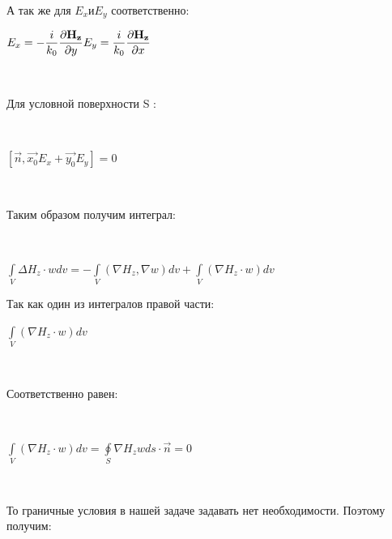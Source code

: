 \begin{flushleft}
	А так же для $ E_{x} и E_{y} $ соответственно: \\
\end{flushleft}
\begin{center}
	$ E_{x} = - 
	\dfrac{i}{k_{0}}
	\dfrac{\partial\vec{H_{z}}}{\partial y} \\
	E_{y} = \dfrac{i}{k_{0}}
	\dfrac{\partial\vec{H_{z}}}{\partial x} \\ $
\end{center} \\
\begin{flushleft}
	Для условной поверхности S :
\end{flushleft} \\
\begin{center}
	$ [\vec{n}, \vec{x_{0}}E_{x} + \vec{y_{0}}E_{y}] = 0 $
\end{center}\\

\begin{flushleft}
	Таким образом получим интеграл:
\end{flushleft} \\

\begin{center}
	$ \int\limits_{V}^{} \Delta H_{z} \cdot wdv = - \int\limits_{V}^{}(\nabla H_{z}, \nabla w)dv +  \int\limits_{V}^{}(\nabla H_{z} \cdot w)dv
	$ \\
\end{center}

\begin{flushleft}
	Так как один из интегралов правой части: 
\end{flushleft}
\begin{center}
	$  \int\limits_{V}^{}(\nabla H_{z} \cdot w)dv $
\end{center} \\
\begin{flushleft}
	Соответственно равен: 
\end{flushleft}\\
\begin{center}
	$\int\limits_{V}^{}(\nabla H_{z} \cdot w)dv = \oint\limits_{S}^{} \nabla H_{z}  wds \cdot \vec{n} = 0 $ \\
\end{center}
\\
\begin{flushleft}
	То граничные условия в нашей задаче задавать нет необходимости.
	Поэтому получим:
\end{flushleft} \\

